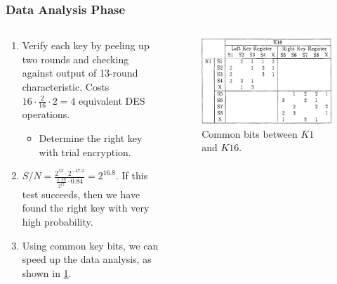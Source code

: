 \documentclass{beamer}
\begin{document}
    \begin{frame}
        \frametitle{Data Analysis Phase}
        \begin{columns}
            \begin{column}{0.6\linewidth}
                \begin{enumerate}
                    \item<1-> Verify each key by peeling up two rounds and
                    checking against output of 13-round characteristic. Costs
                    \(16 \cdot \frac{2}{16} \cdot 2 = 4\) equivalent DES
                    operations.
                    \begin{itemize}
                        \item<2-> Determine the right key with trial encryption.
                    \end{itemize}
                    \item<3-> \(S/N = \frac{2^{52} \cdot
                    2^{-47.2}}{\frac{1.19}{2^{12}} \cdot 0.84} = 2^{16.8}\). If
                    this test succeeds, then we have found the right key with
                    very high probability.
                    \item<4-> Using common key bits, we can speed up the data
                    analysis, as shown in \cref{fig:des-k1-k16}.
                \end{enumerate}
            \end{column}
            \begin{column}{0.4\linewidth}
                \begin{figure}[!ht]
                    \centering
                    \includegraphics[width=\columnwidth]{images/des-k1-k16.png}
                    \caption{Common bits between \(K1\) and \(K16\).}
                    \label{fig:des-k1-k16}
                \end{figure}
            \end{column}
        \end{columns}
    \end{frame}
\end{document}
